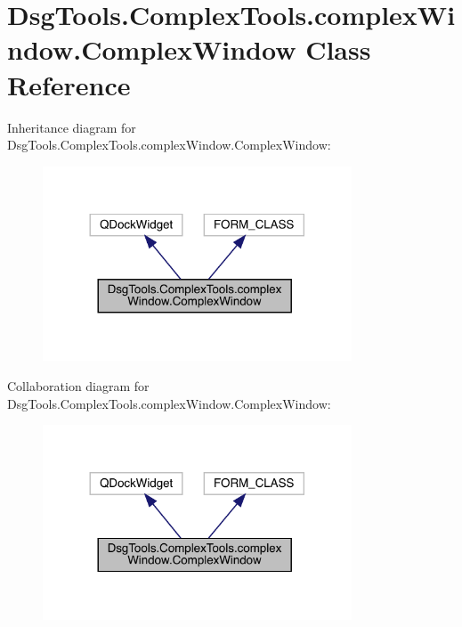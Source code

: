 \hypertarget{class_dsg_tools_1_1_complex_tools_1_1complex_window_1_1_complex_window}{}\section{Dsg\+Tools.\+Complex\+Tools.\+complex\+Window.\+Complex\+Window Class Reference}
\label{class_dsg_tools_1_1_complex_tools_1_1complex_window_1_1_complex_window}


Inheritance diagram for Dsg\+Tools.\+Complex\+Tools.\+complex\+Window.\+Complex\+Window\+:
\nopagebreak
\begin{figure}[H]
\begin{center}
\leavevmode
\includegraphics[width=260pt]{class_dsg_tools_1_1_complex_tools_1_1complex_window_1_1_complex_window__inherit__graph}
\end{center}
\end{figure}


Collaboration diagram for Dsg\+Tools.\+Complex\+Tools.\+complex\+Window.\+Complex\+Window\+:
\nopagebreak
\begin{figure}[H]
\begin{center}
\leavevmode
\includegraphics[width=260pt]{class_dsg_tools_1_1_complex_tools_1_1complex_window_1_1_complex_window__coll__graph}
\end{center}
\end{figure}
